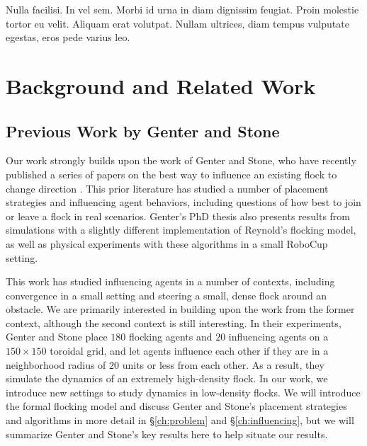 \begin{savequote}[75mm]
Nulla facilisi. In vel sem. Morbi id urna in diam dignissim feugiat. Proin molestie tortor eu velit. Aliquam erat volutpat. Nullam ultrices, diam tempus vulputate egestas, eros pede varius leo.
\end{savequote}

\chapter{Background and Related Work}
\label{ch:background}

\section{Previous Work by Genter and Stone}
Our work strongly builds upon the work of Genter and Stone, who have recently
published a series of papers on the best way to influence an existing flock to
change direction \cite{genter2015placement, genter2014neighborsorientherd,
genter2013visionstationary, genter2013backsearch,
genter2016facegoalfacecurrent, genter201612steplookahead}.
This prior literature has studied a number of placement strategies and
influencing agent behaviors, including questions of how best to join or leave
a flock in real scenarios.
Genter's PhD thesis also presents results from simulations with a slightly
different implementation of Reynold's flocking model, as well as physical
experiments with these algorithms in a small RoboCup setting.

This work has studied influencing agents in a number of contexts, including
convergence in a small setting and steering a small, dense flock around an
obstacle.
We are primarily interested in building upon the work from the former context,
although the second context is still interesting.
In their experiments, Genter and Stone place $180$ flocking agents and $20$
influencing agents on a $150\times150$ toroidal grid, and let agents influence
each other if they are in a neighborhood radius of $20$ units or less from each
other.
As a result, they simulate the dynamics of an extremely high-density flock.
In our work, we introduce new settings to study dynamics in low-density flocks.
We will introduce the formal flocking model and discuss Genter and Stone's
placement strategies and algorithms in more detail in \S\ref{ch:problem} and
\S\ref{ch:influencing}, but we will summarize Genter and Stone's key results
here to help situate our results.

